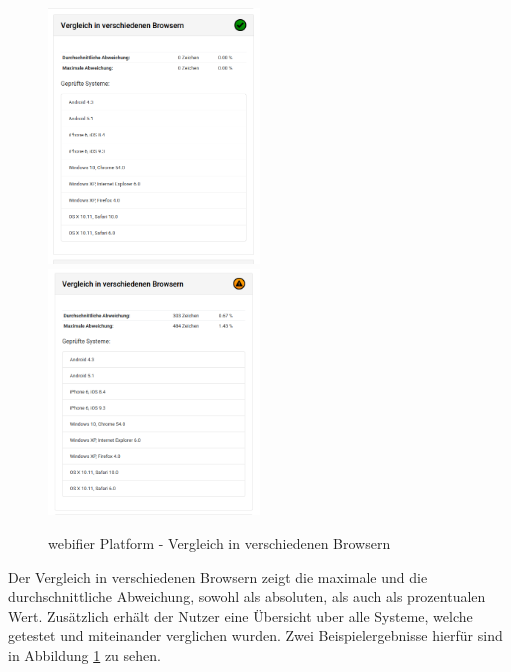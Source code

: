 \begin{figure}[H]
\centerline{%
\includegraphics[width=0.5\textwidth]{images/platform/header-inspection-clean}%
\includegraphics[width=0.5\textwidth]{images/platform/header-inspection-suspicious}%
}%
\caption{webifier Platform - Vergleich in verschiedenen Browsern}
\label{fig:platform-result-header-inspection}
\end{figure}

Der Vergleich in verschiedenen Browsern zeigt die maximale und die durchschnittliche Abweichung, sowohl als absoluten, als auch als prozentualen Wert. Zusätzlich erhält der Nutzer eine Übersicht uber alle Systeme, welche getestet und miteinander verglichen wurden. Zwei Beispielergebnisse hierfür sind in Abbildung \ref{fig:platform-result-header-inspection} zu sehen.

